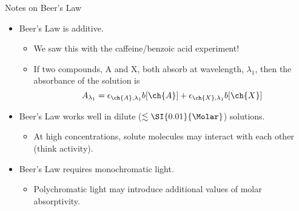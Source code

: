 \documentclass[notes=show]{beamer}
\begin{document}
\begin{frame}{Notes on Beer's Law}
	\begin{itemize}
		\item Beer's Law is \alert{additive}.
			\begin{itemize}
				\item We saw this with the caffeine/benzoic acid
					experiment!
				\item If two compounds, A and X, both absorb at
					wavelength, $\lambda_1$, then the
					absorbance of the solution is
					\begin{equation*}
						A_{\lambda_1} =
						\epsilon_{\ch{A},\lambda_1} b
						[\ch{A}] +
						\epsilon_{\ch{X},\lambda_1} b
						[\ch{X}]
					\end{equation*}
			\end{itemize}
		\item Beer's Law works well in \alert{dilute} ($\lesssim
			\SI{0.01}{\Molar}$) solutions.
			\begin{itemize}
				\item At high concentrations, solute molecules
					may interact with each other (think
					activity).
			\end{itemize}
		\item Beer's Law requires \alert{monochromatic} light.
			\begin{itemize}
				\item Polychromatic light may introduce
					additional values of molar absorptivity.
			\end{itemize}
	\end{itemize}
\end{frame}
\end{document}
